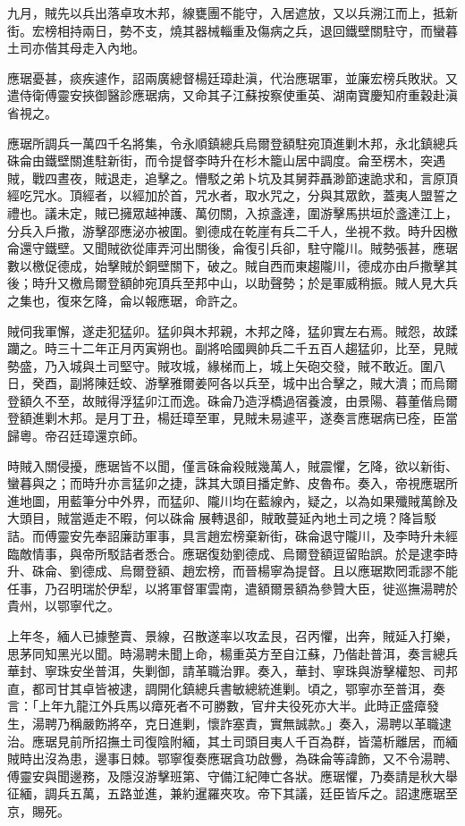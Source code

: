 \begin{pinyinscope}
九月，賊先以兵出落卓攻木邦，線甕團不能守，入居遮放，又以兵溯江而上，抵新街。宏榜相持兩日，勢不支，燒其器械輜重及傷病之兵，退回鐵壁關駐守，而蠻暮土司亦偕其母走入內地。

應琚憂甚，痰疾遽作，詔兩廣總督楊廷璋赴滇，代治應琚軍，並廉宏榜兵敗狀。又遣侍衛傅靈安挾御醫診應琚病，又命其子江蘇按察使重英、湖南寶慶知府重穀赴滇省視之。

應琚所調兵一萬四千名將集，令永順鎮總兵烏爾登額駐宛頂進剿木邦，永北鎮總兵硃侖由鐵壁關進駐新街，而令提督李時升在杉木籠山居中調度。侖至楞木，突遇賊，戰四晝夜，賊退走，追擊之。懵駁之弟卜坑及其舅莽聶渺節速詭求和，言原頂經吃咒水。頂經者，以經加於首，咒水者，取水咒之，分與其眾飲，蓋夷人盟誓之禮也。議未定，賊已擁眾越神護、萬仞關，入掠盞達，圍游擊馬拱垣於盞達江上，分兵入戶撒，游擊邵應泌亦被圍。劉德成在乾崖有兵二千人，坐視不救。時升因檄侖還守鐵壁。又聞賊欲從庫弄河出關後，侖復引兵卻，駐守隴川。賊勢張甚，應琚數以檄促德成，始擊賊於銅壁關下，破之。賊自西而東趨隴川，德成亦由戶撒擊其後；時升又檄烏爾登額帥宛頂兵至邦中山，以助聲勢；於是軍威稍振。賊人見大兵之集也，復來乞降，侖以報應琚，命許之。

賊伺我軍懈，遂走犯猛卯。猛卯與木邦親，木邦之降，猛卯實左右焉。賊怨，故蹂躪之。時三十二年正月丙寅朔也。副將哈國興帥兵二千五百人趨猛卯，比至，見賊勢盛，乃入城與土司堅守。賊攻城，緣梯而上，城上矢砲交發，賊不敢近。圍八日，癸酉，副將陳廷蛟、游擊雅爾姜阿各以兵至，城中出合擊之，賊大潰；而烏爾登額久不至，故賊得浮猛卯江而逸。硃侖乃造浮橋過宿養渡，由景陽、暮董偕烏爾登額進剿木邦。是月丁丑，楊廷璋至軍，見賊未易遽平，遂奏言應琚病已痊，臣當歸粵。帝召廷璋還京師。

時賊入關侵擾，應琚皆不以聞，僅言硃侖殺賊幾萬人，賊震懼，乞降，欲以新街、蠻暮與之；而時升亦言猛卯之捷，誅其大頭目播定鮓、皮魯布。奏入，帝視應琚所進地圖，用藍筆分中外界，而猛卯、隴川均在藍線內，疑之，以為如果殲賊萬餘及大頭目，賊當遁走不暇，何以硃侖展轉退卻，賊敢蔓延內地土司之境？降旨駁詰。而傅靈安先奉詔廉訪軍事，具言趙宏榜棄新街，硃侖退守隴川，及李時升未經臨敵情事，與帝所駁詰者悉合。應琚復劾劉德成、烏爾登額逗留貽誤。於是逮李時升、硃侖、劉德成、烏爾登額、趙宏榜，而晉楊寧為提督。且以應琚欺罔乖謬不能任事，乃召明瑞於伊犁，以將軍督軍雲南，遣額爾景額為參贊大臣，徙巡撫湯聘於貴州，以鄂寧代之。

上年冬，緬人已據整賣、景線，召散遂率以攻孟艮，召丙懼，出奔，賊延入打樂，思茅同知黑光以聞。時湯聘未聞上命，楊重英方至自江蘇，乃偕赴普洱，奏言總兵華封、寧珠安坐普洱，失剿御，請革職治罪。奏入，華封、寧珠與游擊權恕、司邦直，都司甘其卓皆被逮，調開化鎮總兵書敏總統進剿。頃之，鄂寧亦至普洱，奏言：「上年九龍江外兵馬以瘴死者不可勝數，官弁夫役死亦大半。此時正盛瘴發生，湯聘乃稱嚴飭將卒，克日進剿，懷詐塞責，實無誠款。」奏入，湯聘以革職逮治。應琚見前所招撫土司復陰附緬，其土司頭目夷人千百為群，皆蕩析離居，而緬賊時出沒為患，邊事日棘。鄂寧復奏應琚貪功啟釁，為硃侖等諱飾，又不令湯聘、傅靈安與聞邊務，及隱沒游擊班第、守備江紀陣亡各狀。應琚懼，乃奏請是秋大舉征緬，調兵五萬，五路並進，兼約暹羅夾攻。帝下其議，廷臣皆斥之。詔逮應琚至京，賜死。


\end{pinyinscope}
